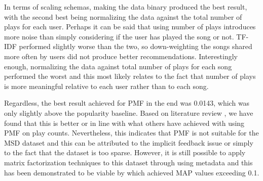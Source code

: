 \documentclass[11pt,preprint]{aastex}
\begin{document}
In terms of scaling schemas, making the data binary produced the best result, with the second best being normalizing the data against the total number of plays for each user. Perhaps it can be said that using number of plays introduces more noise than simply considering if the user has played the song or not. TF-IDF performed slightly worse than the two, so down-weighting the songs shared more often by users did not produce better recommendations. Interestingly enough, normalizing the data against total number of plays for each song performed the worst and this most likely relates to the fact that number of plays is more meaningful relative to each user rather than to each song. 
 
Regardless, the best result achieved for PMF in the end was 0.0143, which was only slightly above the popularity baseline. Based on literature review \citep{li2012million, McFee:2012:MSD:2187980.2188222}, we have found that this is better or in line with what others have achieved with using PMF on play counts. Nevertheless, this indicates that PMF is not suitable for the MSD dataset and this can be attributed to the implicit feedback issue or simply to the fact that the dataset is too sparse. However, it is still possible to apply matrix factorization techniques to this dataset through using metadata and this has been demonstrated to be viable by \citet{liangcodebook} which achieved MAP values exceeding 0.1.  

%
\end{document}
